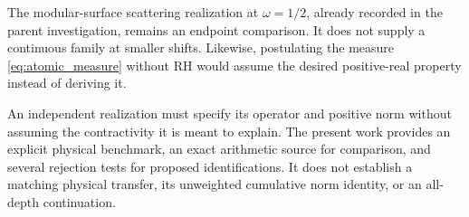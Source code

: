 The modular-surface scattering realization at $\omega=1/2$, already
recorded in the parent investigation, remains an endpoint comparison. It
does not supply a continuous family at smaller shifts. Likewise,
postulating the measure \eqref{eq:atomic_measure} without RH would assume
the desired positive-real property instead of deriving it.

An independent realization must specify its operator and positive norm
without assuming the contractivity it is meant to explain. The present
work provides an explicit physical benchmark, an exact arithmetic source
for comparison, and several rejection tests for proposed identifications.
It does not establish a matching physical transfer, its unweighted
cumulative norm identity, or an all-depth continuation.
